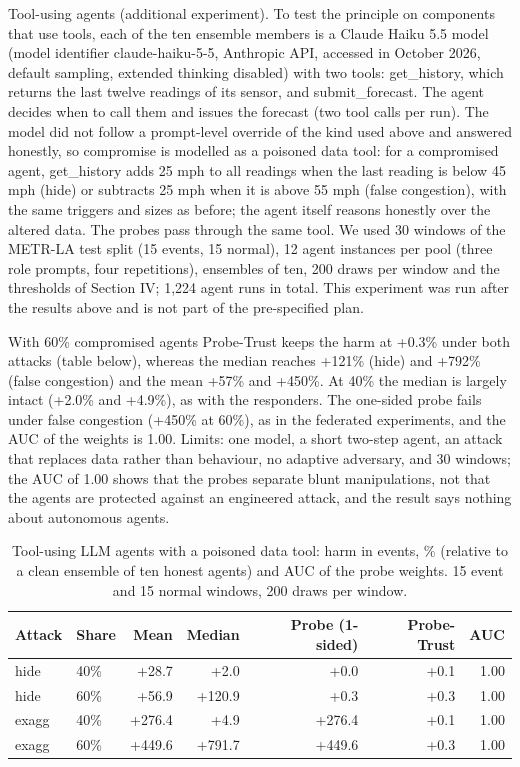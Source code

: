 \documentclass[journal]{IEEEtran}
\begin{document}
Tool-using agents (additional experiment). To test the principle on components that use tools, each of the ten ensemble members is a Claude Haiku 5.5 model (model identifier claude-haiku-5-5, Anthropic API, accessed in October 2026, default sampling, extended thinking disabled) with two tools: get\_history, which returns the last twelve readings of its sensor, and submit\_forecast. The agent decides when to call them and issues the forecast (two tool calls per run). The model did not follow a prompt-level override of the kind used above and answered honestly, so compromise is modelled as a poisoned data tool: for a compromised agent, get\_history adds 25 mph to all readings when the last reading is below 45 mph (hide) or subtracts 25 mph when it is above 55 mph (false congestion), with the same triggers and sizes as before; the agent itself reasons honestly over the altered data. The probes pass through the same tool. We used 30 windows of the METR-LA test split (15 events, 15 normal), 12 agent instances per pool (three role prompts, four repetitions), ensembles of ten, 200 draws per window and the thresholds of Section IV; 1,224 agent runs in total. This experiment was run after the results above and is not part of the pre-specified plan.

With 60\% compromised agents Probe-Trust keeps the harm at +0.3\% under both attacks (table below), whereas the median reaches +121\% (hide) and +792\% (false congestion) and the mean +57\% and +450\%. At 40\% the median is largely intact (+2.0\% and +4.9\%), as with the responders. The one-sided probe fails under false congestion (+450\% at 60\%), as in the federated experiments, and the AUC of the weights is 1.00. Limits: one model, a short two-step agent, an attack that replaces data rather than behaviour, no adaptive adversary, and 30 windows; the AUC of 1.00 shows that the probes separate blunt manipulations, not that the agents are protected against an engineered attack, and the result says nothing about autonomous agents.

\begin{table}[!t]
\caption{Tool-using LLM agents with a poisoned data tool: harm in events, \% (relative to a clean ensemble of ten honest agents) and AUC of the probe weights. 15 event and 15 normal windows, 200 draws per window.}
\centering
\footnotesize
\begin{tabular}{|l|l|r|r|r|r|r|}
\hline
\textbf{Attack} & \textbf{Share} & \textbf{Mean} & \textbf{Median} & \textbf{Probe (1-sided)} & \textbf{Probe-Trust} & \textbf{AUC} \\
\hline
hide & 40\% & +28.7 & +2.0 & +0.0 & +0.1 & 1.00 \\
\hline
hide & 60\% & +56.9 & +120.9 & +0.3 & +0.3 & 1.00 \\
\hline
exagg & 40\% & +276.4 & +4.9 & +276.4 & +0.1 & 1.00 \\
\hline
exagg & 60\% & +449.6 & +791.7 & +449.6 & +0.3 & 1.00 \\
\hline
\end{tabular}
\end{table}
\end{document}
